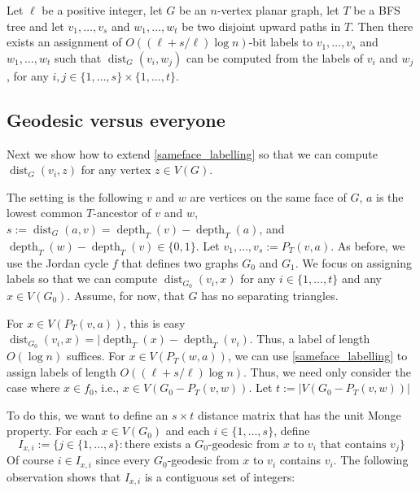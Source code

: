 \documentclass{patmorin}
\DeclareMathOperator{\dist}{dist}
\DeclareMathOperator{\depth}{depth}
\begin{document}
\begin{lem}\label{general_labelling}
    Let $\ell$ be a positive integer, let $G$ be an $n$-vertex planar graph, let $T$ be a BFS tree and let $v_1,\ldots,v_s$ and $w_1,\ldots,w_t$ be two disjoint upward paths in $T$. Then there exists an assignment of $O((\ell + s/\ell)\log n)$-bit labels to $v_1,\ldots,v_s$ and $w_1,\ldots,w_t$ such that $\dist_G(v_i,w_j)$ can be computed from the labels of $v_i$ and $w_j$, for any $i,j\in\{1,\ldots,s\}\times\{1,\ldots,t\}$.
\end{lem}


\subsection{Geodesic versus everyone}

Next we show how to extend \cref{sameface_labelling} so that we can compute $\dist_G(v_i,z)$ for any vertex $z\in V(G)$.


The setting is the following $v$ and $w$ are vertices on the same face of $G$, $a$ is the lowest common $T$-ancestor of $v$ and $w$, $s:=\dist_G(a,v)=\depth_T(v)-\depth_T(a)$, and $\depth_T(w)-\depth_T(v)\in\{0,1\}$.  Let $v_1,\ldots,v_s:=P_T(v,a)$.  As before, we use the Jordan cycle $f$ that defines two graphs $G_0$ and $G_1$. We focus on assigning labels so that we can compute $\dist_{G_0}(v_i,x)$ for any $i\in\{1,\ldots,t\}$ and any $x\in V(G_0)$.  Assume, for now, that $G$ has no separating triangles.

For $x\in V(P_T(v,a))$, this is easy $\dist_{G_0}(v_i,x)=|\depth_T(x)-\depth_T(v_i)$.  Thus, a label of length $O(\log n)$ suffices.  For $x\in V(P_T(w,a))$, we can use \cref{sameface_labelling} to assign labels of length $O((\ell+s/\ell)\log n)$.  Thus, we need only consider the case where $x\in f_0$, i.e., $x\in V(G_0-P_T(v,w))$.  Let $t:=|V(G_0-P_T(v,w))|$

To do this, we want to define an $s\times t$ distance matrix that has the unit Monge property.  For each $x\in V(G_0)$ and each $i\in\{1,\ldots,s\}$, define
\[
    I_{x,i}:=\{j\in\{1,\ldots,s\}: \text{there exists a $G_0$-geodesic from $x$ to $v_i$ that contains $v_j$}\}
\]
Of course $i\in I_{x,i}$ since every $G_0$-geodesic from $x$ to $v_i$ contains $v_i$.  The following observation shows that $I_{x,i}$ is a contiguous set of integers:
\end{document}
